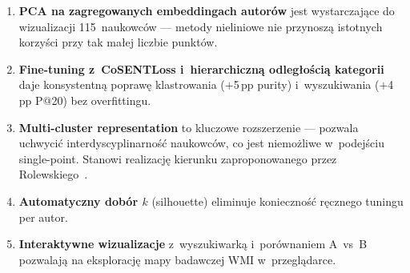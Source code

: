 \documentclass[a4paper,11pt]{article}
\begin{document}
\begin{enumerate}
  \item \textbf{PCA na zagregowanych embeddingach autorów} jest wystarczające do wizualizacji 115~naukowców --- metody nieliniowe nie przynoszą istotnych korzyści przy tak małej liczbie punktów.
  \item \textbf{Fine-tuning z~CoSENTLoss i~hierarchiczną odległością kategorii} daje konsystentną poprawę klastrowania ($+$5\,pp purity) i~wyszukiwania ($+$4\,pp P@20) bez overfittingu.
  \item \textbf{Multi-cluster representation} to kluczowe rozszerzenie --- pozwala uchwycić interdyscyplinarność naukowców, co jest niemożliwe w~podejściu single-point. Stanowi realizację kierunku zaproponowanego przez Rolewskiego~\cite{rolewski2024}.
  \item \textbf{Automatyczny dobór $k$} (silhouette) eliminuje konieczność ręcznego tuningu per autor.
  \item \textbf{Interaktywne wizualizacje} z~wyszukiwarką i~porównaniem A~vs~B pozwalają na eksplorację mapy badawczej WMI w~przeglądarce.
\end{enumerate}
\end{document}
